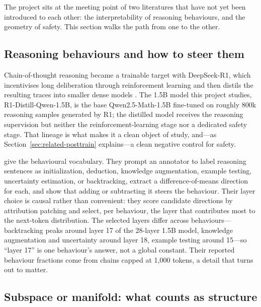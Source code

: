 \documentclass[10pt]{article}
\begin{document}
The project sits at the meeting point of two literatures that have not yet been
introduced to each other: the interpretability of reasoning behaviours, and the
geometry of safety. This section walks the path from one to the other.

\subsection{Reasoning behaviours and how to steer them}

Chain-of-thought reasoning became a trainable target with DeepSeek-R1, which
incentivises long deliberation through reinforcement learning and then distils the
resulting traces into smaller dense models \citep{deepseek2025r1}. The 1.5B model
this project studies, R1-Distill-Qwen-1.5B, is the base Qwen2.5-Math-1.5B
\citep{yang2024qwenmath} fine-tuned on roughly 800k reasoning samples generated by
R1; the distilled model receives the reasoning supervision but neither the
reinforcement-learning stage nor a dedicated safety stage. That lineage is what
makes it a clean object of study, and---as Section~\ref{sec:related-posttrain}
explains---a clean negative control for safety.

\citet{venhoff2025reasoning} give the behavioural vocabulary. They prompt an
annotator to label reasoning sentences as initialization, deduction, knowledge
augmentation, example testing, uncertainty estimation, or backtracking, extract a
difference-of-means direction for each, and show that adding or subtracting it
steers the behaviour. Their layer choice is causal rather than convenient: they
score candidate directions by attribution patching and select, per behaviour, the
layer that contributes most to the next-token distribution. The selected layers
differ across behaviours---backtracking peaks around layer 17 of the 28-layer
1.5B model, knowledge augmentation and uncertainty around layer 18, example
testing around 15---so ``layer 17'' is one behaviour's answer, not a global
constant. Their reported behaviour fractions come from chains capped at 1{,}000
tokens, a detail that turns out to matter.

\subsection{Subspace or manifold: what counts as structure}
\label{sec:related-geometry}
\end{document}
